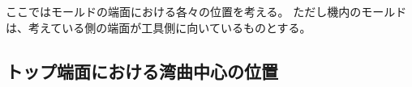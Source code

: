 






ここではモールドの端面における各々の位置を考える。
ただし機内のモールドは、考えている側の端面が工具側に向いているものとする。







\subsection{トップ端面における湾曲中心の位置}



